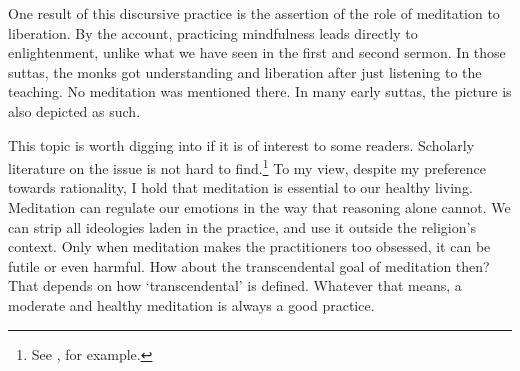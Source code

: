 One result of this discursive practice is the assertion of the role of meditation to liberation. By the account, practicing mindfulness leads directly to enlightenment, unlike what we have seen in the first and second sermon. In those suttas, the monks got understanding and liberation after just listening to the teaching. No meditation was mentioned there. In many early suttas, the picture is also depicted as such.

This topic is worth digging into if it is of interest to some readers. Scholarly literature on the issue is not hard to find.\footnote{See \citealp{wynne:origin}, for example.} To my view, despite my preference towards rationality, I hold that meditation is essential to our healthy living. Meditation can regulate our emotions in the way that reasoning alone cannot. We can strip all ideologies laden in the practice, and use it outside the religion's context. Only when meditation makes the practitioners too obsessed, it can be futile or even harmful. How about the transcendental goal of meditation then? That depends on how `transcendental' is defined. Whatever that means, a moderate and healthy meditation is always a good practice.
